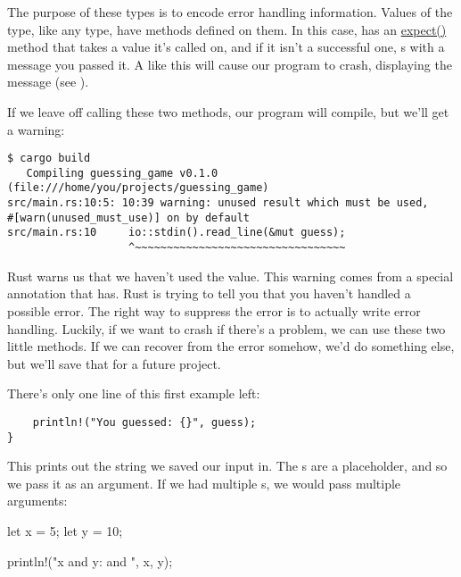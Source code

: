 \blank

The purpose of these  types is to encode error handling information. Values of the  type, like any 
type, have methods defined on them. In this case,  has an 
\href{https://doc.rust-lang.org/std/option/enum.Option.html\#method.expect}{expect()} method that takes a value it's called on, 
and if it isn't a successful one, s with a message you passed it. A  like this will cause our program to crash,
displaying the message (see ).

\blank

If we leave off calling these two methods, our program will compile, but we'll get a warning:

\begin{verbatim}
$ cargo build
   Compiling guessing_game v0.1.0 (file:///home/you/projects/guessing_game)
src/main.rs:10:5: 10:39 warning: unused result which must be used,
#[warn(unused_must_use)] on by default
src/main.rs:10     io::stdin().read_line(&mut guess);
                   ^~~~~~~~~~~~~~~~~~~~~~~~~~~~~~~~~~
\end{verbatim}

Rust warns us that we haven't used the  value. This warning comes from a special annotation that 
 has. Rust is trying to tell you that you haven't handled a possible error. The right way to suppress 
the error is to actually write error handling. Luckily, if we want to crash if there's a problem, we can use these two 
little methods. If we can recover from the error somehow, we'd do something else, but we'll save that for a future project.

\blank

There's only one line of this first example left:

\begin{verbatim}
    println!("You guessed: {}", guess);
} 
\end{verbatim}

This prints out the string we saved our input in. The \code{\{\}}s are a placeholder, and so we pass it  as an 
argument. If we had multiple \code{\{\}}s, we would pass multiple arguments:

\begin{rustc}
let x = 5;
let y = 10;

println!("x and y: {} and {}", x, y);
\end{rustc}

